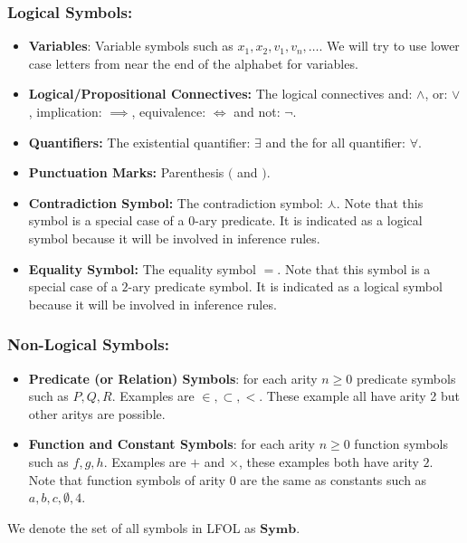 \documentclass[12pt]{article}
\begin{document}
\subsubsection*{Logical Symbols:}
\begin{itemize}
\item{\textbf{Variables}: Variable symbols such as $x_1, x_2, v_1,v_n,\ldots$. We will try to use lower case letters from near the end of the alphabet for variables.}
\item{\textbf{Logical/Propositional Connectives:} The logical connectives and: $\land$, or: $\lor$, implication: $\implies$, equivalence: $\iff$ and not: $\lnot$.}
\item{\textbf{Quantifiers:} The existential quantifier: $\exists$} and the for all quantifier: $\forall$.
\item{\textbf{Punctuation Marks:} Parenthesis $($ and $)$.}
\item{\textbf{Contradiction Symbol:} The contradiction symbol: $\curlywedge$. Note that this symbol is a special case of a $0$-ary predicate. It is indicated as a logical symbol because it will be involved in inference rules.}
\item{\textbf{Equality Symbol:} The equality symbol $=$. Note that this symbol is a special case of a $2$-ary predicate symbol. It is indicated as a logical symbol because it will be involved in inference rules.}
\end{itemize}

\subsubsection*{Non-Logical Symbols:}
\begin{itemize}
\item{\textbf{Predicate (or Relation) Symbols}: for each arity $n \ge 0$ predicate symbols such as $P, Q, R$. Examples are $\in, \subset, <$. These example all have arity 2 but other aritys are possible.}
\item{\textbf{Function and Constant Symbols}: for each arity $n \ge 0$ function symbols such as $f, g, h$. Examples are $+$ and $\times$, these examples both have arity $2$. Note that function symbols of arity $0$ are the same as constants such as $a,b,c,\emptyset,4$.}
\end{itemize}

We denote the set of all symbols in LFOL as $\mathbf{Symb}$.

\hrulefill
\end{document}
